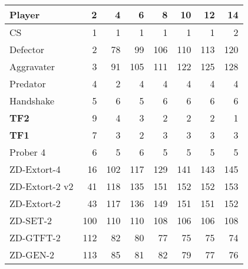 \begin{tabular}{lrrrrrrr}
\toprule
         Player &      2 &      4 &      6 &      8 &     10 &     12 &     14 \\
\midrule
             CS &    1 &    1 &    1 &    1 &    1 &    1 &    2 \\
       Defector &    2 &   78 &   99 &  106 &  110 &  113 &  120 \\
     Aggravater &    3 &   91 &  105 &  111 &  122 &  125 &  128 \\
       Predator &    4 &    2 &    4 &    4 &    4 &    4 &    4 \\
      Handshake &    5 &    6 &    5 &    6 &    6 &    6 &    6 \\
\midrule
            \textbf{TF2} &    9 &    4 &    3 &    2 &    2 &    2 &    1 \\
            \textbf{TF1} &    7 &    3 &    2 &    3 &    3 &    3 &    3 \\
       Prober 4 &    6 &    5 &    6 &    5 &    5 &    5 &    5 \\
\midrule
    ZD-Extort-4 &   16 &  102 &  117 &  129 &  141 &  143 &  145 \\
 ZD-Extort-2 v2 &   41 &  118 &  135 &  151 &  152 &  152 &  153 \\
    ZD-Extort-2 &   43 &  117 &  136 &  149 &  151 &  151 &  152 \\
       ZD-SET-2 &  100 &  110 &  110 &  108 &  106 &  106 &  108 \\
      ZD-GTFT-2 &  112 &   82 &   80 &   77 &   75 &   75 &   74 \\
       ZD-GEN-2 &  113 &   85 &   81 &   82 &   79 &   77 &   76 \\
\bottomrule
\end{tabular}